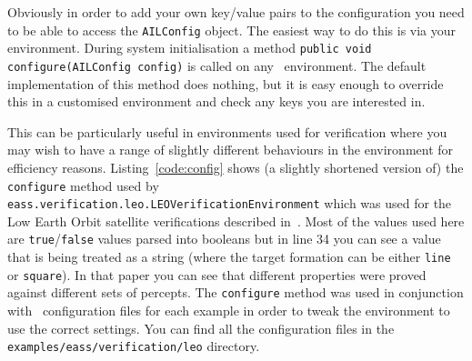 Obviously in order to add your own key/value pairs to the configuration you need to be able to access the \texttt{AILConfig} object.  The easiest way to do this is via your environment.  During system initialisation a method \texttt{public void configure(AILConfig config)} is called on any \ail\ environment.  The default implementation of this method does nothing, but it is easy enough to override this in a customised environment and check any keys you are interested in.

This can be particularly useful in environments used for verification where you may wish to have a range of slightly different behaviours in the environment for efficiency reasons.  Listing~\ref{code:config} shows (a slightly shortened version of) the \texttt{configure} method used by \texttt{eass.verification.leo.LEOVerificationEnvironment} which was used for the Low Earth Orbit satellite verifications described in~\cite{dennis14:_pract}.  Most of the values used here are \texttt{true}/\texttt{false} values parsed into booleans but in line 34 you can see a value that is being treated as a string (where the target formation can be either \texttt{line} or \texttt{square}).  In that paper you can see that different properties were proved against different sets of percepts.  The \texttt{configure} method was used in conjunction with \ail\ configuration files for each example in order to tweak the environment to use the correct settings.  You can find all the configuration files in the \texttt{examples/eass/verification/leo} directory.

